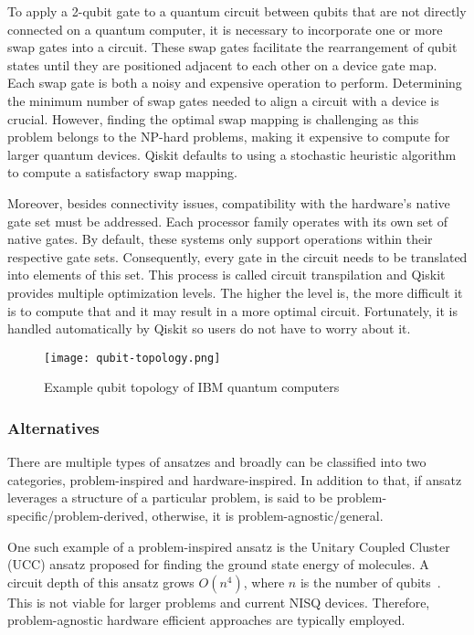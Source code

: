 To apply a 2-qubit gate to a quantum circuit between qubits that are not directly connected on a quantum computer, it is necessary to incorporate one or more swap gates into a circuit. These swap gates facilitate the rearrangement of qubit states until they are positioned adjacent to each other on a device gate map. Each swap gate is both a noisy and expensive operation to perform. Determining the minimum number of swap gates needed to align a circuit with a device is crucial. However, finding the optimal swap mapping is challenging as this problem belongs to the NP-hard problems, making it expensive to compute for larger quantum devices. Qiskit defaults to using a stochastic heuristic algorithm to compute a satisfactory swap mapping.

Moreover, besides connectivity issues, compatibility with the hardware's native gate set must be addressed. Each processor family operates with its own set of native gates. By default, these systems only support operations within their respective gate sets. Consequently, every gate in the circuit needs to be translated into elements of this set. This process is called circuit transpilation and Qiskit provides multiple optimization levels. The higher the level is, the more difficult it is to compute that and it may result in a more optimal circuit. Fortunately, it is handled automatically by Qiskit so users do not have to worry about it. 

\begin{figure}[H]
    \texttt{[image: qubit-topology.png]}
    \caption{Example qubit topology of IBM quantum computers~\cite{img:topology}}
    \label{fig:qubit_topology}
\end{figure}

\subsubsection{Alternatives}
There are multiple types of ansatzes and broadly can be classified into two categories, problem-inspired and hardware-inspired. In addition to that, if ansatz leverages a structure of a particular problem, is said to be problem-specific/problem-derived, otherwise, it is problem-agnostic/general.

One such example of a problem-inspired ansatz is the Unitary Coupled Cluster (UCC) ansatz proposed for finding the ground state energy of molecules. A circuit depth of this ansatz grows $O(n^4)$, where $n$ is the number of qubits~\cite{ucc_ansatz}. This is not viable for larger problems and current NISQ devices. Therefore, problem-agnostic hardware efficient approaches are typically employed.

